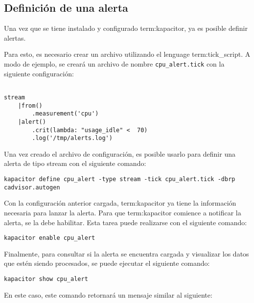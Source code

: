 \subsection{Definición de una alerta}
\label{definir-alerta}

Una vez que se tiene instalado y configurado \gls{term:kapacitor}, ya es
posible definir alertas.

Para esto, es necesario crear un archivo utilizando el lenguage
\gls{term:tick_script}. A modo de ejemplo, se creará un archivo de nombre
\texttt{cpu\_alert.tick} con la siguiente configuración:

\begin{lstlisting}

stream
    |from()
        .measurement('cpu')
    |alert()
        .crit(lambda: "usage_idle" <  70)
        .log('/tmp/alerts.log')

\end{lstlisting}

Una vez creado el archivo de configuración, es posible usarlo para definir una
alerta de tipo stream con el siguiente comando:

\begin{lstlisting}
kapacitor define cpu_alert -type stream -tick cpu_alert.tick -dbrp cadvisor.autogen
\end{lstlisting}

Con la configuración anterior cargada, \gls{term:kapacitor} ya tiene la
información necesaria para lanzar la alerta. Para que \gls{term:kapacitor}
comience a notificar la alerta, se la debe habilitar. Esta tarea puede
realizarse con el siguiente comando:

\begin{lstlisting}
kapacitor enable cpu_alert
\end{lstlisting}

Finalmente, para consultar si la alerta se encuentra cargada y visualizar los
datos que estén siendo procesados, se puede ejecutar el siguiente comando:

\begin{lstlisting}
kapacitor show cpu_alert
\end{lstlisting}

En este caso, este comando retornará un mensaje similar al siguiente:

